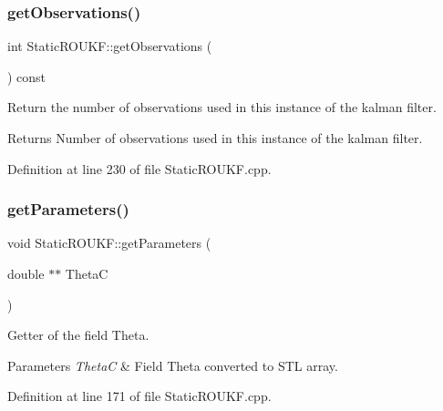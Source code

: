 \mbox{\label{classStaticROUKF_ae94282d13b307666494ee76aadc58aa4}} 
\subsubsection{\texorpdfstring{get\+Observations()}{getObservations()}}
{\footnotesize\ttfamily int Static\+R\+O\+U\+K\+F\+::get\+Observations (\begin{DoxyParamCaption}{ }\end{DoxyParamCaption}) const}

Return the number of observations used in this instance of the kalman filter. \begin{DoxyReturn}{Returns}
Number of observations used in this instance of the kalman filter. 
\end{DoxyReturn}


Definition at line 230 of file Static\+R\+O\+U\+K\+F.\+cpp.

\mbox{\label{classStaticROUKF_ac1acb518b1978a0c07bc9b8c6a1fc36a}} 
\subsubsection{\texorpdfstring{get\+Parameters()}{getParameters()}}
{\footnotesize\ttfamily void Static\+R\+O\+U\+K\+F\+::get\+Parameters (\begin{DoxyParamCaption}\item[{double $\ast$$\ast$}]{ThetaC }\end{DoxyParamCaption})\hspace{0.3cm}{\ttfamily [virtual]}}

Getter of the field {\ttfamily Theta}. 
\begin{DoxyParams}{Parameters}
{\em ThetaC} & Field {\ttfamily Theta} converted to S\+TL array. \\
\hline
\end{DoxyParams}


Definition at line 171 of file Static\+R\+O\+U\+K\+F.\+cpp.

\mbox{\label{classStaticROUKF_a5000d72faeb9a7f496ab24ae09ead1ab}} 
